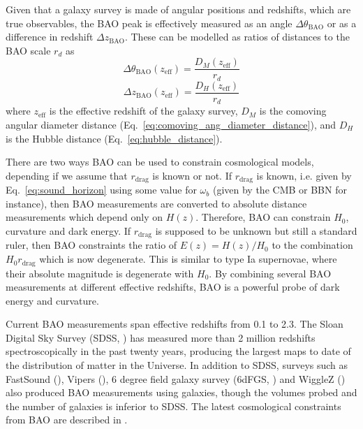    Given that a galaxy survey is made of angular positions and redshifts, 
    which are true observables, 
    the BAO peak is effectively measured as an angle $\Delta \theta_\mathrm{BAO}$ 
    or as a difference in redshift $\Delta z_\mathrm{BAO}$. 
    These can be modelled as ratios of distances to the BAO scale $r_d$ as
    \begin{equation}
        \Delta \theta_\mathrm{BAO}(z_\mathrm{eff}) = \frac{D_M(z_\mathrm{eff})}{r_d}
        \label{eq:bao_angular}
    \end{equation}
    \begin{equation}
        \Delta z_\mathrm{BAO}(z_\mathrm{eff}) = \frac{D_H(z_\mathrm{eff})}{r_d}
        \label{eq:bao_radial}
    \end{equation}
    where $z_\mathrm{eff}$ is the effective redshift of the galaxy survey, 
    $D_M$ is the comoving angular diameter distance (Eq.~\ref{eq:comoving_ang_diameter_distance}),
    and $D_H$ is the Hubble distance (Eq.~\ref{eq:hubble_distance}). 

    There are two ways BAO can be used to constrain cosmological models, 
    depending if we assume that $r_\mathrm{drag}$ is known or not. 
    If $r_\mathrm{drag}$ is known, i.e. given by Eq.~\ref{eq:sound_horizon} 
    using some value for $\omega_b$
    (given by the CMB or BBN for instance), then BAO measurements
    are converted to absolute distance measurements which depend only on  
    $H(z)$. Therefore, BAO can constrain $H_0$, curvature and dark energy. 
    If $r_\mathrm{drag}$ is supposed to be unknown but still a standard ruler, 
    then BAO constraints the ratio of $E(z) = H(z)/H_0$ to the combination 
    $H_0 r_\mathrm{drag}$ which is now degenerate. This is similar to 
    type Ia supernovae, where their absolute magnitude is degenerate with $H_0$.
    By combining several BAO measurements at different effective redshifts, 
    BAO is a powerful probe of dark energy and curvature. 

    Current BAO measurements span effective redshifts from 0.1 to 2.3.
    The Sloan Digital Sky Survey (SDSS, 
    \cite{eisensteinSDSSIIIMassiveSpectroscopic2011, blantonSloanDigitalSky2017}) 
    has measured more than 2 million 
    redshifts spectroscopically in the past twenty years, 
    producing the largest maps to date of the
    distribution of matter in the Universe. In addition to SDSS, 
    surveys such as FastSound (\cite{okumuraSubaruFMOSGalaxy2016}), 
    Vipers (\cite{pezzottaVIMOSPublicExtragalactic2017}),
    6 degree field galaxy survey (6dFGS, \cite{beutler6dFGalaxySurvey2012a})
    and WiggleZ (\cite{parkinsonWiggleZDarkEnergy2012}) also
    produced BAO measurements using galaxies, though the volumes 
    probed and the number of galaxies is inferior to SDSS. 
    The latest cosmological constraints from BAO are described in 
    \cite{alamCompletedSDSSIVExtended2021}.



